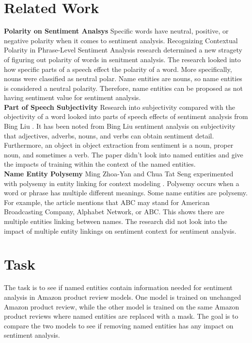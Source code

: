\documentclass[11pt,a4paper]{article}
\begin{document}
\section{Related Work}

\noindent \textbf{Polarity on Sentiment Analsys} Specific words have neutral, positive, or negative polarity when it comes to sentiment analysis. Recognizing Contextual Polarity in Phrase-Level Sentiment Analysis research determined a new stragety of figuring out polarity of words in senitment analysis. The research looked into how specific parts of a speech effect the polarity of a word. More specifically, nouns were classified as neutral polar. Name entities are nouns, so name entities is considered a neutral polarity. Therefore, name entities can be proposed as not having sentiment value for sentiment analysis. \\

\noindent \textbf{Part of Speech Subjectivity} Research into subjectivity compared with the objectivity of a word looked into parts of speech effects of sentiment analysis from Bing Liu \cite{subject}. It has been noted from Bing Liu sentiment analysis on subjectivity that adjectives, adverbs, nouns, and verbs can obtain sentiment detail. Furthermore, an object in object extraction from sentiment is a noun, proper noun, and sometimes a verb. The paper didn't look into named entities and give the impacts of training within the context of the named entities. \\

\noindent \textbf{Name Entity Polysemy} Ming Zhoa-Yan and Chua Tat Seng experimented with polysemy in entity linking for context modeling \cite{MING201518}. Polysemy occurs when a word or phrase has multiple different meanings. Some name entities are polysemy. For example, the article mentions that ABC may stand for American Broadcasting Company, Alphabet Network, or ABC. This shows there are multiple entities linking between names. The research did not look into the impact of multiple entity linkings on sentiment context for sentiment analysis.

\section{Task}

The task is to see if named entities contain information needed for sentiment analysis in Amazon product review models. One model is trained on unchanged Amazon product review, while the other model is trained on the same Amazon product reviews where named entities are replaced with a mask. The goal is to compare the two models to see if removing named entities has any impact on sentiment analysis.
\end{document}
